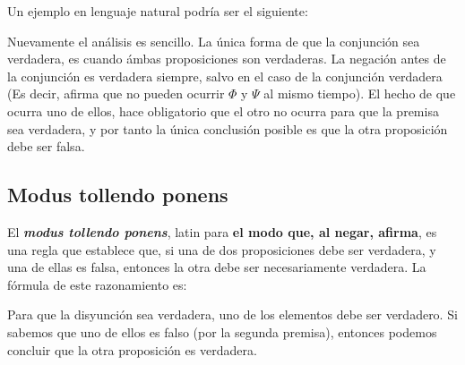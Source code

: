 \begin{minipage}{0.3\textwidth}
    \begin{lreasoning}
        \lpremise{$\lnot (\Phi \land \Psi)$}
        \lpremise{$\Phi$}
        \lconclusion{$\lnot \Psi$}
    \end{lreasoning}
\end{minipage}

Un ejemplo en lenguaje natural podría ser el siguiente:

\begin{minipage}{0.5\textwidth}
    \begin{lreasoning}
    \end{lreasoning}
\end{minipage}

Nuevamente el análisis es sencillo. La única forma de que la conjunción sea
verdadera, es cuando ámbas proposiciones son verdaderas. La negación antes de la
conjunción es verdadera siempre, salvo en el caso de la conjunción verdadera (Es
decir, afirma que no pueden ocurrir $\Phi$ y $\Psi$ al mismo tiempo). El hecho
de que ocurra uno de ellos, hace obligatorio que el otro no ocurra para que la
premisa sea verdadera, y por tanto la única conclusión posible es que la otra
proposición debe ser falsa.

\subsection{Modus tollendo ponens}

El \textit{\textbf{modus tollendo ponens}}, latin para \textbf{el modo que, al
negar, afirma}, es una regla que establece que, si una de dos proposiciones debe
ser verdadera, y una de ellas es falsa, entonces la otra debe ser necesariamente
verdadera. La fórmula de este razonamiento es:

\begin{minipage}{0.3\textwidth}
    \begin{lreasoning}
        \lpremise{$\Phi \lor \Psi$}
        \lpremise{$\lnot \Phi$}
        \lconclusion{$\Psi$}
    \end{lreasoning}
\end{minipage}

Para que la disyunción sea verdadera, uno de los elementos debe ser verdadero.
Si sabemos que uno de ellos es falso (por la segunda premisa), entonces podemos
concluir que la otra proposición es verdadera.

